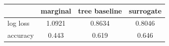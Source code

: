 \begin{tabular}{lccc}
\toprule
 & marginal & tree baseline & surrogate \\
\midrule
log loss & 1.0921 & 0.8634 & 0.8046 \\
accuracy & 0.443 & 0.619 & 0.646 \\
\bottomrule
\end{tabular}
